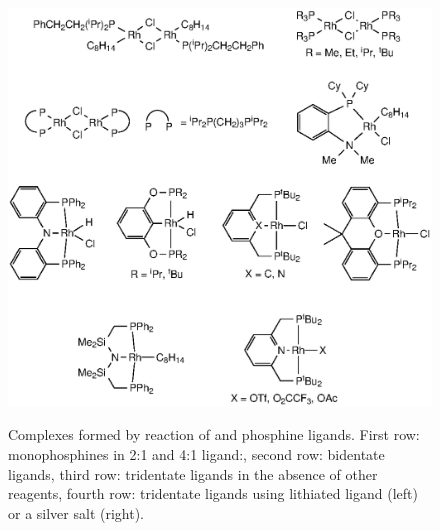 \begin{figure}[h!]
\begin{center}
\vspace{0.5cm}
\includegraphics{../Figures/RhCOEClcomplexes.eps}
\caption[Complexes from  and phosphine ligands]{Complexes formed by reaction of  and phosphine ligands.  First row: monophosphines in 2:1 and 4:1 ligand:, second row: bidentate ligands, third row: tridentate ligands in the absence of other reagents, fourth row: tridentate ligands using lithiated ligand (left) or a silver salt (right).}
\vspace{0.2cm}
\label{RhcoeClcomplexes}
\end{center}
\end{figure}
\vspace{0.2cm}

